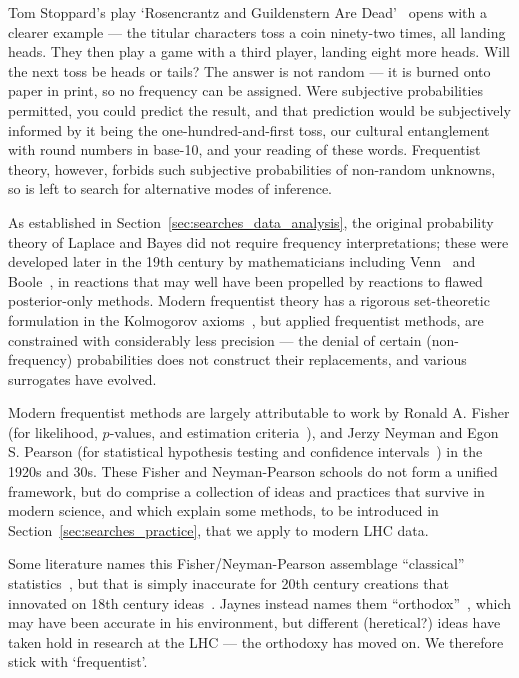 Tom Stoppard's play `Rosencrantz and Guildenstern Are Dead'~\cite{
stoppard1967rosencrantz
}
opens with a clearer example ---
the titular characters toss a coin ninety-two times, all landing heads.
They then play a game with a third player, landing eight more heads.
Will the next toss be heads or tails?
The answer is not random --- it is burned onto paper in print, so no frequency
can be assigned.
Were subjective probabilities permitted, you could predict the result, and that
prediction would be subjectively informed by it being the one-hundred-and-first
toss, our cultural entanglement with round numbers in base-10, and your reading
of these words.
Frequentist theory, however, forbids such subjective probabilities of
non-random unknowns, so is left to search for alternative modes of inference.

As established in Section~\ref{sec:searches_data_analysis}, the original
probability theory of Laplace and Bayes did not require frequency
interpretations; these were developed later in the 19th century by
mathematicians including Venn~\cite{venn1866logic} and
Boole~\cite{boole1854investigation}, in reactions that may well have been
propelled by reactions to flawed posterior-only methods.
Modern frequentist theory has a rigorous set-theoretic formulation in the
Kolmogorov axioms~\cite{
kolomogoroff1933de,
kolomogoroff1950translated,
Neyman1937Outline,
axioms1010038
}, but applied frequentist methods, are constrained with considerably less
precision --- the denial of certain (non-frequency) probabilities does not
construct their replacements, and various surrogates have evolved.

Modern frequentist methods are largely attributable to work by
Ronald A. Fisher (for likelihood, $p$-values, and estimation criteria~\cite{
fisher1912fitting,
fisher1915frequency,
fisher1921probable,
fisher1922estimators,
fisher1925smrw,
fisher1956statistical
}),
and Jerzy Neyman and Egon S. Pearson
(for statistical hypothesis testing and confidence intervals~\cite{
neymanpearson1933lemma,
neymanpearson1928max
})
in the 1920s and 30s.
These Fisher and Neyman-Pearson schools do not form a unified framework, but
do comprise a collection of ideas and practices that survive in modern science,
and which explain some methods, to be introduced in
Section~\ref{sec:searches_practice}, that we apply to modern LHC data.

Some literature names this Fisher/Neyman-Pearson assemblage
``classical'' statistics~\cite{
Neyman1937Outline,
lehmann2011fisher,
Feldman:1997qc
}, but that is simply inaccurate for 20th century creations that innovated on
18th century ideas~\cite{bayes1763lii, laplace1774stigler}.
Jaynes instead names them ``orthodox''~\cite{
Jaynes1976intervals,
jaynes2003probability
},
which may have been accurate in his environment, but different
(heretical?) ideas have taken hold in research at the LHC ---
the orthodoxy has moved on.
We therefore stick with `frequentist'.

